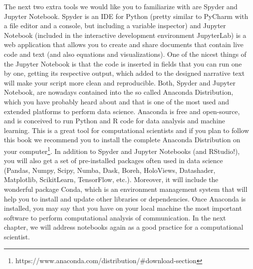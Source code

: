 The next two extra tools we would like you to familiarize with are Spyder and Jupyter Notebook. Spyder is an IDE for Python (pretty similar to PyCharm with a file editor and a console, but including a variable inspector) and Jupyter Notebook (included in the interactive development environment JupyterLab) is a web application that allows you to create and share documents that contain live code and text (and also equations and visualizations).  One of the nicest things of the Jupyter Notebook is that the code is inserted in fields that you can run one by one, getting its respective output, which added to the designed narrative text will make your script more clean and reproducible. Both, Spyder and Jupyter Notebook, are nowadays contained into the so called Anaconda Distribution, which you have probably heard about and that is one of the most used and extended platforms to perform data science. Anaconda is free and open-source, and is conceived to run Python and R code for data analysis and machine learning. This is a great tool for computational scientists and if you plan to follow this book we recommend you to install the complete Anaconda Distribution on your computer\footnote{https://www.anaconda.com/distribution/\#download-section}. In addition to Spyder and Jupyter Notebooks (and RStudio!), you will also get a set of pre-installed packages often used in data science (Pandas, Numpy, Scipy, Numba, Dask, Boreh, HoloViews, Datashader, Matplotlib, ScikitLearn, TensorFlow, etc.). Moreover, it will include the wonderful package Conda, which is an environment management system that will help you to install and update other libraries or dependencies. Once Anaconda is installed, you may say that you have on your local machine the most important software to perform computational analysis of communication. In the next chapter, we will address notebooks again as a good practice for a computational scientist.
